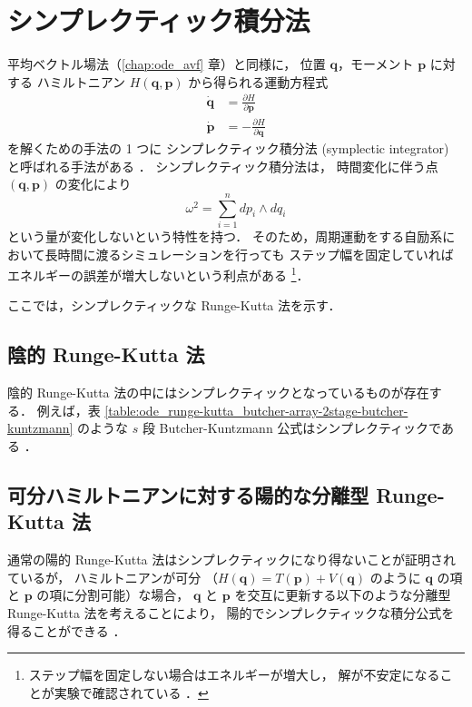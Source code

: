 %

\chapter{シンプレクティック積分法}

平均ベクトル場法（\ref{chap:ode_avf} 章）と同様に，
位置 $\bm{q}$，モーメント $\bm{p}$ に対する
ハミルトニアン $H(\bm{q}, \bm{p})$ から得られる運動方程式
\begin{align}
    \dot{\bm{q}} & = \frac{\partial H}{\partial \bm{p}}  \\
    \dot{\bm{p}} & = -\frac{\partial H}{\partial \bm{q}}
\end{align}
を解くための手法の 1 つに
シンプレクティック積分法 (symplectic integrator) と呼ばれる手法がある
\cite[Section II.16.]{Hairer1993}．
シンプレクティック積分法は，
時間変化に伴う点 $(\bm{q}, \bm{p})$ の変化により
\begin{equation}
    \omega^2 = \sum_{i=1}^{n} dp_i \wedge dq_i
\end{equation}
という量が変化しないという特性を持つ．
そのため，周期運動をする自励系において長時間に渡るシミュレーションを行っても
ステップ幅を固定していればエネルギーの誤差が増大しないという利点がある
\cite{Yoshida2013}
\footnote{ステップ幅を固定しない場合はエネルギーが増大し，%
    解が不安定になることが実験で確認されている%
    \cite[Section II.16.]{Hairer1993}．}．

ここでは，シンプレクティックな Runge-Kutta 法を示す．

\section{陰的 Runge-Kutta 法}

陰的 Runge-Kutta 法の中にはシンプレクティックとなっているものが存在する．
例えば，表 \ref{table:ode_runge-kutta_butcher-array-2stage-butcher-kuntzmann} のような
$s$ 段 Butcher-Kuntzmann 公式はシンプレクティックである
\cite[Section II.16.]{Hairer1993}．

\section{可分ハミルトニアンに対する陽的な分離型 Runge-Kutta 法}

通常の陽的 Runge-Kutta 法はシンプレクティックになり得ないことが証明されているが，
ハミルトニアンが可分
（$H(\bm{q}) = T(\bm{p}) + V(\bm{q})$ のように
$\bm{q}$ の項と $\bm{p}$ の項に分割可能）な場合，
$\bm{q}$ と $\bm{p}$ を交互に更新する以下のような分離型 Runge-Kutta 法を考えることにより，
陽的でシンプレクティックな積分公式を得ることができる
\cite[Section II.16.]{Hairer1993}．

